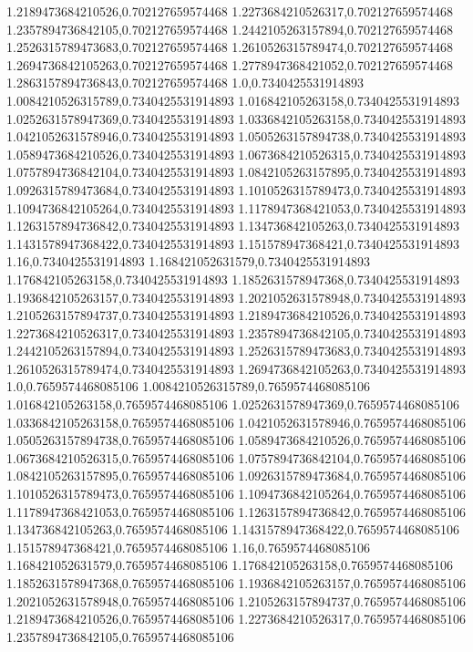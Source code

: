 1.2189473684210526,0.702127659574468
1.2273684210526317,0.702127659574468
1.2357894736842105,0.702127659574468
1.2442105263157894,0.702127659574468
1.2526315789473683,0.702127659574468
1.2610526315789474,0.702127659574468
1.2694736842105263,0.702127659574468
1.2778947368421052,0.702127659574468
1.2863157894736843,0.702127659574468
1.0,0.7340425531914893
1.0084210526315789,0.7340425531914893
1.016842105263158,0.7340425531914893
1.0252631578947369,0.7340425531914893
1.0336842105263158,0.7340425531914893
1.0421052631578946,0.7340425531914893
1.0505263157894738,0.7340425531914893
1.0589473684210526,0.7340425531914893
1.0673684210526315,0.7340425531914893
1.0757894736842104,0.7340425531914893
1.0842105263157895,0.7340425531914893
1.0926315789473684,0.7340425531914893
1.1010526315789473,0.7340425531914893
1.1094736842105264,0.7340425531914893
1.1178947368421053,0.7340425531914893
1.1263157894736842,0.7340425531914893
1.134736842105263,0.7340425531914893
1.1431578947368422,0.7340425531914893
1.151578947368421,0.7340425531914893
1.16,0.7340425531914893
1.168421052631579,0.7340425531914893
1.176842105263158,0.7340425531914893
1.1852631578947368,0.7340425531914893
1.1936842105263157,0.7340425531914893
1.2021052631578948,0.7340425531914893
1.2105263157894737,0.7340425531914893
1.2189473684210526,0.7340425531914893
1.2273684210526317,0.7340425531914893
1.2357894736842105,0.7340425531914893
1.2442105263157894,0.7340425531914893
1.2526315789473683,0.7340425531914893
1.2610526315789474,0.7340425531914893
1.2694736842105263,0.7340425531914893
1.0,0.7659574468085106
1.0084210526315789,0.7659574468085106
1.016842105263158,0.7659574468085106
1.0252631578947369,0.7659574468085106
1.0336842105263158,0.7659574468085106
1.0421052631578946,0.7659574468085106
1.0505263157894738,0.7659574468085106
1.0589473684210526,0.7659574468085106
1.0673684210526315,0.7659574468085106
1.0757894736842104,0.7659574468085106
1.0842105263157895,0.7659574468085106
1.0926315789473684,0.7659574468085106
1.1010526315789473,0.7659574468085106
1.1094736842105264,0.7659574468085106
1.1178947368421053,0.7659574468085106
1.1263157894736842,0.7659574468085106
1.134736842105263,0.7659574468085106
1.1431578947368422,0.7659574468085106
1.151578947368421,0.7659574468085106
1.16,0.7659574468085106
1.168421052631579,0.7659574468085106
1.176842105263158,0.7659574468085106
1.1852631578947368,0.7659574468085106
1.1936842105263157,0.7659574468085106
1.2021052631578948,0.7659574468085106
1.2105263157894737,0.7659574468085106
1.2189473684210526,0.7659574468085106
1.2273684210526317,0.7659574468085106
1.2357894736842105,0.7659574468085106
